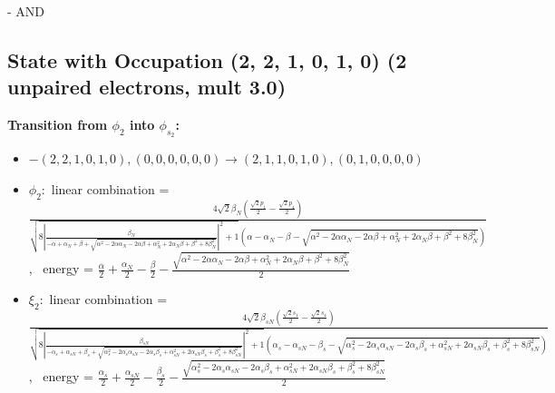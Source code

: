 \documentclass[12pt,a4paper]{article}
\begin{document}
\begin{itemize}
        \end{itemize}
        
 -  AND 
\subsection*{State with Occupation (2, 2, 1, 0, 1, 0) (2 unpaired electrons, mult 3.0)}
        \noindent\textbf{Transition from $\phi_{2}$ into $\phi_{s_{2}}$:}
        \begin{itemize}
            \item $- (2, 2, 1, 0, 1, 0), (0, 0, 0, 0, 0, 0) \rightarrow (2, 1, 1, 0, 1, 0), (0, 1, 0, 0, 0, 0)$
        
            \item $\phi_{2}:$ linear combination = $\frac{4 \sqrt{2} \beta_{N} \left(\frac{\sqrt{2} p_{1}}{2} - \frac{\sqrt{2} p_{4}}{2}\right)}{\sqrt{8 \left|{\frac{\beta_{N}}{- \alpha + \alpha_{N} + \beta + \sqrt{\alpha^{2} - 2 \alpha \alpha_{N} - 2 \alpha \beta + \alpha_{N}^{2} + 2 \alpha_{N} \beta + \beta^{2} + 8 \beta_{N}^{2}}}}\right|^{2} + 1} \left(\alpha - \alpha_{N} - \beta - \sqrt{\alpha^{2} - 2 \alpha \alpha_{N} - 2 \alpha \beta + \alpha_{N}^{2} + 2 \alpha_{N} \beta + \beta^{2} + 8 \beta_{N}^{2}}\right)}$, \
            energy = $\frac{\alpha}{2} + \frac{\alpha_{N}}{2} - \frac{\beta}{2} - \frac{\sqrt{\alpha^{2} - 2 \alpha \alpha_{N} - 2 \alpha \beta + \alpha_{N}^{2} + 2 \alpha_{N} \beta + \beta^{2} + 8 \beta_{N}^{2}}}{2}$
            
            \item $\xi_{2}:$ linear combination = $\frac{4 \sqrt{2} \beta_{s N} \left(\frac{\sqrt{2} s_{1}}{2} - \frac{\sqrt{2} s_{4}}{2}\right)}{\sqrt{8 \left|{\frac{\beta_{s N}}{- \alpha_{s} + \alpha_{s N} + \beta_{s} + \sqrt{\alpha_{s}^{2} - 2 \alpha_{s} \alpha_{s N} - 2 \alpha_{s} \beta_{s} + \alpha_{s N}^{2} + 2 \alpha_{s N} \beta_{s} + \beta_{s}^{2} + 8 \beta_{s N}^{2}}}}\right|^{2} + 1} \left(\alpha_{s} - \alpha_{s N} - \beta_{s} - \sqrt{\alpha_{s}^{2} - 2 \alpha_{s} \alpha_{s N} - 2 \alpha_{s} \beta_{s} + \alpha_{s N}^{2} + 2 \alpha_{s N} \beta_{s} + \beta_{s}^{2} + 8 \beta_{s N}^{2}}\right)}$, \
            energy = $\frac{\alpha_{s}}{2} + \frac{\alpha_{s N}}{2} - \frac{\beta_{s}}{2} - \frac{\sqrt{\alpha_{s}^{2} - 2 \alpha_{s} \alpha_{s N} - 2 \alpha_{s} \beta_{s} + \alpha_{s N}^{2} + 2 \alpha_{s N} \beta_{s} + \beta_{s}^{2} + 8 \beta_{s N}^{2}}}{2}$
            

\end{itemize}
\end{document}
